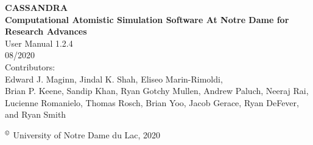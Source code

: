 \begin{center}
\vspace*{2 in}
{\huge{\bf CASSANDRA} }\\
\vspace{0.5in}
{\huge { \bf  Computational Atomistic Simulation Software At Notre Dame for Research Advances}} \\
\vspace{1 in}
User Manual 1.2.4 \\
\vspace{.2 in}
08/2020 \\
\vspace{0.2in}
Contributors: \\
\vspace{0.2in}
Edward J. Maginn, Jindal K. Shah, Eliseo Marin-Rimoldi, \\
Brian P. Keene, Sandip Khan, Ryan Gotchy Mullen, Andrew Paluch,
Neeraj Rai, Lucienne Romanielo, Thomas Rosch, Brian Yoo, Jacob Gerace, Ryan DeFever, and Ryan Smith
\end{center}
\vspace{1.0in}
$^\copyright$ University of Notre Dame du Lac, 2020
